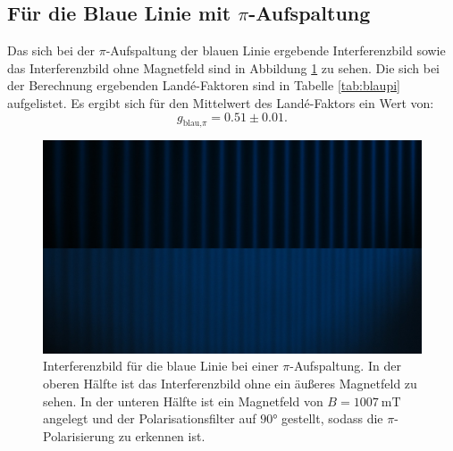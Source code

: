 \subsection{Für die Blaue Linie mit \texorpdfstring{$\pi$}{π}-Aufspaltung}
\label{sec:blau_pi_Lande}
Das sich bei der $\pi$-Aufspaltung der blauen Linie ergebende Interferenzbild
sowie das Interferenzbild ohne Magnetfeld sind in Abbildung \ref{fig:blaupicut}
zu sehen. Die sich bei der Berechnung ergebenden Landé-Faktoren sind in Tabelle
\ref{tab:blaupi} aufgelistet.
Es ergibt sich für den Mittelwert des Landé-Faktors ein Wert von:
\begin{equation}
  \label{eq:lande_blau_pi}
  g_\text{blau,$\pi$} = 0.51 \pm 0.01.
\end{equation}
\begin{figure}
  \centering
  \includegraphics[width=\textwidth]{blaucut18A.JPG}
  \caption{Interferenzbild für die blaue Linie bei einer $\pi$-Aufspaltung.
  In der oberen Hälfte ist das Interferenzbild
  ohne ein äußeres Magnetfeld zu sehen. In der unteren Hälfte ist ein Magnetfeld von
  $B=\SI{1007}{\milli\tesla}$ angelegt und der Polarisationsfilter auf $90°$ gestellt, sodass
  die $\pi$-Polarisierung zu erkennen ist.}
  \label{fig:blaupicut}
\end{figure}
